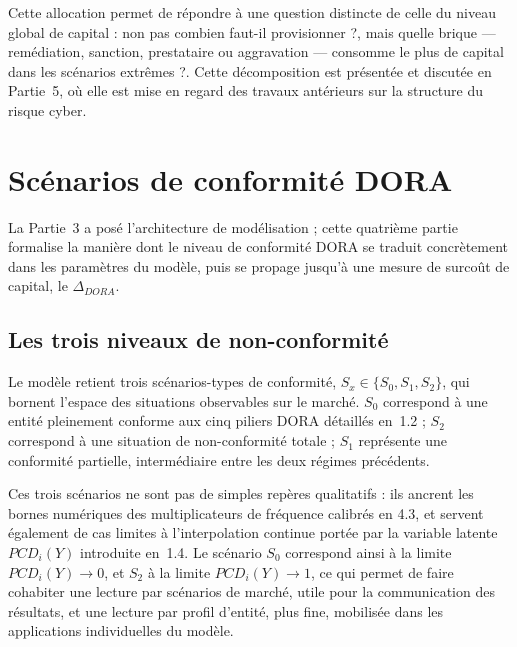 \documentclass[11pt,a4paper]{article}
\theoremstyle{navystyle}
\theoremstyle{navydef}
\begin{document}
Cette allocation permet de répondre à une question distincte de celle du
niveau global de capital : non pas \og combien faut-il provisionner ?\fg{}, mais
\og quelle brique --- remédiation, sanction, prestataire ou aggravation ---
consomme le plus de capital dans les scénarios extrêmes ?\fg{}. Cette
décomposition est présentée et discutée en Partie~5, où elle est mise en
regard des travaux antérieurs sur la structure du risque cyber.

\vspace{1em}


\section{Scénarios de conformité DORA}

La Partie~3 a posé l'architecture de modélisation ; cette quatrième partie
formalise la manière dont le niveau de conformité DORA se traduit
concrètement dans les paramètres du modèle, puis se propage jusqu'à une
mesure de surcoût de capital, le $\Delta_{DORA}$.

\subsection{Les trois niveaux de non-conformité}

Le modèle retient trois scénarios-types de conformité, $S_x \in \{S_0, S_1,
S_2\}$, qui bornent l'espace des situations observables sur le marché.
$S_0$ correspond à une entité pleinement conforme aux cinq piliers DORA
détaillés en~1.2 ; $S_2$ correspond à une situation de non-conformité
totale ; $S_1$ représente une conformité partielle, intermédiaire entre les
deux régimes précédents.

Ces trois scénarios ne sont pas de simples repères qualitatifs : ils
ancrent les bornes numériques des multiplicateurs de fréquence calibrés en
4.3, et servent également de cas limites à l'interpolation continue portée
par la variable latente $PCD_i(Y)$ introduite en~1.4. Le scénario $S_0$
correspond ainsi à la limite $PCD_i(Y) \to 0$, et $S_2$ à la limite
$PCD_i(Y) \to 1$, ce qui permet de faire cohabiter une lecture par
scénarios de marché, utile pour la communication des résultats, et une
lecture par profil d'entité, plus fine, mobilisée dans les applications
individuelles du modèle.
\end{document}
